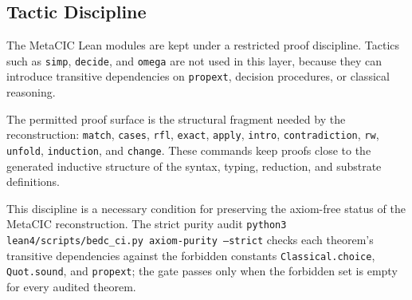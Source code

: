 \subsection{Tactic Discipline}\label{subsec:reconstruction-tactic-discipline}

The MetaCIC Lean modules are kept under a restricted proof discipline. Tactics
such as \texttt{simp}, \texttt{decide}, and \texttt{omega} are not used in
this layer, because they can introduce transitive dependencies on
\texttt{propext}, decision procedures, or classical reasoning.

The permitted proof surface is the structural fragment needed by the
reconstruction: \texttt{match}, \texttt{cases}, \texttt{rfl},
\texttt{exact}, \texttt{apply}, \texttt{intro}, \texttt{contradiction},
\texttt{rw}, \texttt{unfold}, \texttt{induction}, and \texttt{change}.
These commands keep proofs close to the generated inductive structure of the
syntax, typing, reduction, and substrate definitions.

This discipline is a necessary condition for preserving the axiom-free status
of the MetaCIC reconstruction. The strict purity audit
\texttt{python3 lean4/scripts/bedc\_ci.py axiom-purity --strict} checks each
theorem's transitive dependencies against the forbidden constants
\texttt{Classical.choice}, \texttt{Quot.sound}, and \texttt{propext}; the gate
passes only when the forbidden set is empty for every audited theorem.

